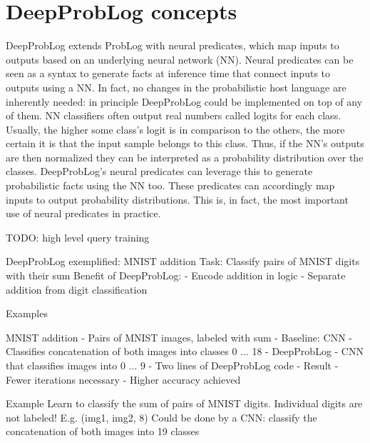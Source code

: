 \section{DeepProbLog concepts}
DeepProbLog extends ProbLog with neural predicates, which map inputs to outputs based on an underlying neural network (NN). Neural predicates can be seen as a syntax to generate facts at inference time that connect inputs to outputs using a NN. In fact, no changes in the probabilistic host language are inherently needed: in principle DeepProbLog could be implemented on top of any of them.
NN classifiers often output real numbers called logits for each class. Usually, the higher some class's logit is in comparison to the others, the more certain it is that the input sample belongs to this class. Thus, if the NN's outputs are then normalized they can be interpreted as a probability distribution over the classes. DeepProbLog's neural predicates can leverage this to generate probabilistic facts using the NN too. These predicates can accordingly map inputs to output probability distributions. This is, in fact, the most important use of neural predicates in practice.

TODO: high level query training




DeepProbLog exemplified:
MNIST addition
Task: Classify pairs of MNIST digits with their sum
Benefit of DeepProbLog:
- Encode addition in logic
- Separate addition from digit classification

Examples

MNIST addition
- Pairs of MNIST images, labeled with sum
- Baseline: CNN
 - Classifies concatenation of both images into classes 0 ... 18
- DeepProbLog
 - CNN that classifies images into 0 ... 9
 - Two lines of DeepProbLog code
- Result
 - Fewer iterations necessary
 - Higher accuracy achieved

Example
Learn to classify the sum of pairs of MNIST digits.
Individual digits are not labeled!
E.g. (img1, img2, 8)
Could be done by a CNN: classify the concatenation of both images into 19 classes


